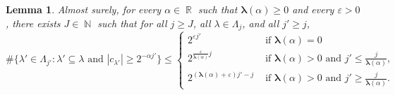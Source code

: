\documentclass[a4paper,11pt,oneside]{article}
\DeclareMathOperator{\R}{\mathbb{R}}
\DeclareMathOperator{\N}{\mathbb{N}}
\newcommand{\modu}[1]{\left\vert{#1}\right\vert}
\theoremstyle{definition}
\theoremstyle{plain}
\newtheorem{lemma}[defi]{Lemma}
\begin{document}
\begin{lemma}\label{lm:rid_RWS}
    Almost surely, for every $\alpha\in\R$ such that $\bm{\lambda}(\alpha)\geq 0$ and every $\varepsilon>0$, there exists $J\in\N$ such that for all $j\geq J$, all $\lambda\in\Lambda_j$, and all $j'\geq j$,
    \[
    \#\{\lambda'\in\Lambda_{j'}:\lambda'\subseteq\lambda\text{ and }\modu{c_{\lambda'}}\geq 2^{-\alpha j'}\}\leq \left\{\begin{array}{ll}
        2^{\varepsilon j'} & \text{ if }\bm{\lambda}(\alpha)=0 \\
        2^{\frac{\varepsilon}{\bm{\lambda}(\alpha)}j} & \text{ if } \bm{\lambda}(\alpha)>0 \text{ and } j'\leq\frac{j}{\bm{\lambda}(\alpha)}, \\
        2^{(\bm{\lambda}(\alpha)+\varepsilon)j'-j} & \text{ if } \bm{\lambda}(\alpha)>0 \text{ and } j'\geq\frac{j}{\bm{\lambda}(\alpha)}.
    \end{array}\right.
    \]
\end{lemma}
\end{document}
